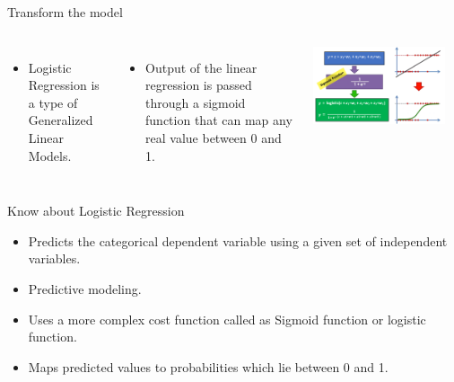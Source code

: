 \documentclass[aspectratio=169,14pt,usenames,dvipsnames]{beamer}
\begin{document}
\begin{frame}{Transform the model}
\begin{columns}
\begin{itemize}
  \item Logistic Regression is a type of Generalized Linear Models.
\end{itemize}
\begin{itemize}
\item Output of the linear regression is passed through a sigmoid function that can map any real value between 0 and 1.
\end{itemize}
\includegraphics[width=0.9\textwidth, height=0.5\textheight]{Images/AIML_LR_IMG2.png}
\end{columns}
\end{frame}

\begin{frame}{ Know about Logistic Regression}
\begin{itemize}
  \item Predicts the categorical dependent variable using a given set of independent variables. 
\end{itemize}
\begin{itemize}
\item Predictive modeling.
\end{itemize}
\begin{itemize}
\item Uses a more complex cost function called as Sigmoid function or logistic function.
\end{itemize}
\begin{itemize}
\item Maps predicted values to probabilities which lie between 0 and 1.
\end{itemize}
\end{frame}
\end{document}
